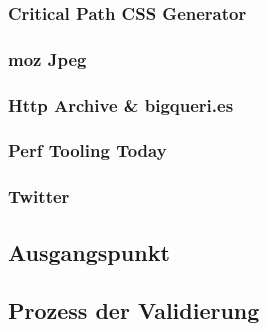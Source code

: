
		\subsubsection{Critical Path CSS Generator} %
		\label{ssub:critical_path_css_generator}
		

		\subsubsection{moz Jpeg} %
		\label{ssub:moz_jpeg}
		

		\subsubsection{Http Archive \& bigqueri.es} %
		\label{ssub:http_archive_bigqueri_es}
			

		\subsubsection{Perf Tooling Today} %
		\label{ssub:perf_tooling_today}
		

		\subsubsection{Twitter} %
		\label{ssub:twitter}
		





	\subsection{Ausgangspunkt}
	\label{sub:ausgangspunkt}
	

	\subsection{Prozess der Validierung}
	\label{sub:prozess_der_validierung}
	

	

